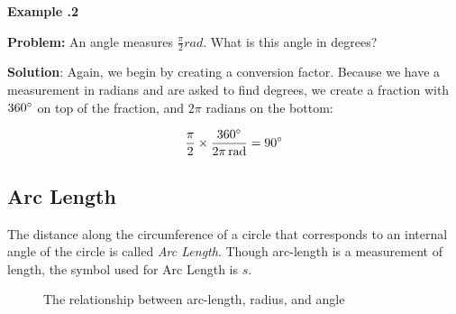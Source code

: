    
    \begin{mdframed}[backgroundcolor=blue!10!white]
   	\begin{center}	
   		\textbf{Example \thesection.2}	
   	\end{center}
   	
   	\textbf{Problem:} An angle measures $\frac{\pi}{2} \si{rad}$.  What is this angle in degrees? 
   	
   	\vspace{0.2 in} 
   	\textbf{Solution}: Again, we begin by creating a conversion factor.  Because we have a measurement in radians and are asked to find degrees, we create a fraction with $360\degree$ on top of the fraction, and  $2\pi$ radians on the bottom:
   	
   	\begin{equation*}
   		\frac{\pi}{2}  \times \frac{360 \degree}{2 \pi \, \si{rad}} = 90 \degree
   	\end{equation*}
 
   	
   \end{mdframed}

\newpage
   \subsection{Arc Length} 
   
   The distance along the circumference of a circle that corresponds to an internal angle of the circle is called \textit{Arc Length}.  Though arc-length is a measurement of length, the symbol used for Arc Length is $s$. 
 \begin{figure}[h]
 	  \begin{center}
   \end{center}
 \caption{The relationship between arc-length, radius, and angle}
 \end{figure}
   	
